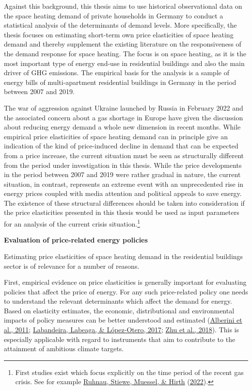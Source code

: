 \documentclass[12pt,twoside]{reedthesis}
\begin{document}
Against this background, this thesis aims to use historical observational data on the space heating demand of private households in Germany to conduct a statistical analysis of the determinants of demand levels. More specifically, the thesis focuses on estimating short-term own price elasticities of space heating demand and thereby supplement the existing literature on the responsiveness of the demand response for space heating. The focus is on space heating, as it is the most important type of energy end-use in residential buildings and also the main driver of GHG emissions. The empirical basis for the analysis is a sample of energy bills of multi-apartment residential buildings in Germany in the period between 2007 and 2019.

The war of aggression against Ukraine launched by Russia in February 2022 and the associated concern about a gas shortage in Europe have given the discussion about reducing energy demand a whole new dimension in recent months. While empirical price elasticities of space heating demand can in principle give an indication of the kind of price-induced decline in demand that can be expected from a price increase, the current situation must be seen as structurally different from the period under investigation in this thesis. While the price developments in the period between 2007 and 2019 were rather gradual in nature, the current situation, in contrast, represents an extreme event with an unprecedented rise in energy prices coupled with media attention and political appeals to save energy. The existence of these structural differences should be taken into consideration if the price elasticities presented in this thesis would be used as input parameters for an analysis of the current crisis situation.\footnote{First studies exist which focus explicitly on the time period of the recent gas crisis. See for example \protect\hyperlink{ref-Ruhnau2022demand}{Ruhnau, Stiewe, Muessel, \& Hirth} (\protect\hyperlink{ref-Ruhnau2022demand}{2022}).}

\textbf{Evaluation of price-related energy policies}

Estimating price elasticities of space heating demand in the residential buildings sector is of relevance for a number of reasons.

First, empirical evidence on price elasticities is generally important for evaluating policies that affect the price of energy. For any such price-related policy one needs to understand the relevant determinants which affect the demand for energy. Based on elasticity estimates, the economic, distributional and environmental impacts of policy measures can be better understood and estimated (\protect\hyperlink{ref-alberini_etal11}{Alberini et al., 2011}; \protect\hyperlink{ref-labandeira_etal17}{Labandeira, Labeaga, \& López-Otero, 2017}; \protect\hyperlink{ref-zhu_etal18}{Zhu et al., 2018}). This is especially applicable with regard to instruments that aim to contribute to the attainment of ambitious climate targets.
\end{document}
